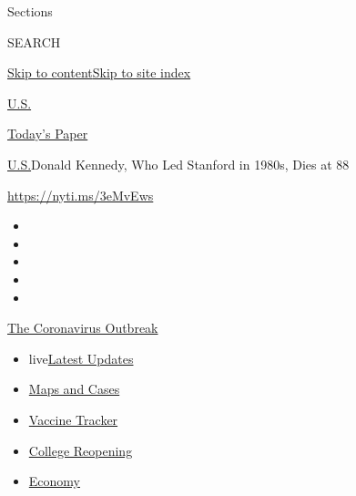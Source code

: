 Sections

SEARCH

\protect\hyperlink{site-content}{Skip to
content}\protect\hyperlink{site-index}{Skip to site index}

\href{https://www.nytimes3xbfgragh.onion/section/us}{U.S.}

\href{https://myaccount.nytimes3xbfgragh.onion/auth/login?response_type=cookie\&client_id=vi}{}

\href{https://www.nytimes3xbfgragh.onion/section/todayspaper}{Today's
Paper}

\href{/section/us}{U.S.}\textbar{}Donald Kennedy, Who Led Stanford in
1980s, Dies at 88

\url{https://nyti.ms/3eMvEws}

\begin{itemize}
\item
\item
\item
\item
\item
\end{itemize}

\href{https://www.nytimes3xbfgragh.onion/news-event/coronavirus?action=click\&pgtype=Article\&state=default\&region=TOP_BANNER\&context=storylines_menu}{The
Coronavirus Outbreak}

\begin{itemize}
\tightlist
\item
  live\href{https://www.nytimes3xbfgragh.onion/2020/08/04/world/coronavirus-covid-19.html?action=click\&pgtype=Article\&state=default\&region=TOP_BANNER\&context=storylines_menu}{Latest
  Updates}
\item
  \href{https://www.nytimes3xbfgragh.onion/interactive/2020/us/coronavirus-us-cases.html?action=click\&pgtype=Article\&state=default\&region=TOP_BANNER\&context=storylines_menu}{Maps
  and Cases}
\item
  \href{https://www.nytimes3xbfgragh.onion/interactive/2020/science/coronavirus-vaccine-tracker.html?action=click\&pgtype=Article\&state=default\&region=TOP_BANNER\&context=storylines_menu}{Vaccine
  Tracker}
\item
  \href{https://www.nytimes3xbfgragh.onion/2020/08/02/us/covid-college-reopening.html?action=click\&pgtype=Article\&state=default\&region=TOP_BANNER\&context=storylines_menu}{College
  Reopening}
\item
  \href{https://www.nytimes3xbfgragh.onion/live/2020/08/03/business/stock-market-today-coronavirus?action=click\&pgtype=Article\&state=default\&region=TOP_BANNER\&context=storylines_menu}{Economy}
\end{itemize}

